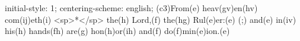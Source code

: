 initial-style: 1;
centering-scheme: english;
(c3)From(e) heav(gv)en(hv) com(ij)eth(i) <sp>*</sp> the(h) Lord,(f) the(hg) Rul(e)er:(e) (;) and(e) in(iv) his(h) hands(fh) are(g) hon(h)or(ih) and(f) do(f)min(e)ion.(e)
